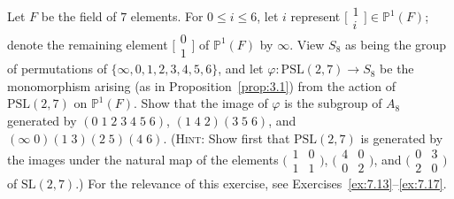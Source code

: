 \documentclass[../Odyssey_Project.tex]{subfiles}
\begin{document}
\begin{exercise}
\label{ex:6.9}
Let $F$ be the field of $7$ elements. For $0 \leq i \leq 6$, let $i$ represent $\bigl[\begin{smallmatrix}1\\ i\end{smallmatrix}\bigr] \in \mathbb{P}^1(F)$; denote the remaining element $\bigl[\begin{smallmatrix}0\\ 1\end{smallmatrix}\bigr]$ of $\mathbb{P}^1(F)$ by $\infty$. View $S_8$ as being the group of permutations of $\{\infty, 0, 1, 2, 3, 4, 5, 6\}$, and let $\varphi\colon \mathrm{PSL}(2,7) \to S_8$ be the monomorphism arising (as in Proposition~\ref{prop:3.1}) from the action of $\mathrm{PSL}(2,7)$ on $\mathbb{P}^1(F)$. Show that the image of $\varphi$ is the subgroup of $A_8$ generated by $(0\;1\;2\;3\;4\;5\;6)$, $(1\;4\;2)(3\;5\;6)$, and $(\infty\;0)(1\;3)(2\;5)(4\;6)$. (\textsc{Hint:} Show first that $\mathrm{PSL}(2,7)$ is generated by the images under the natural map of the elements $\bigl(\begin{smallmatrix}1 & 0\\ 1 & 1\end{smallmatrix}\bigr)$, $\bigl(\begin{smallmatrix}4 & 0\\ 0 & 2\end{smallmatrix}\bigr)$, and $\bigl(\begin{smallmatrix}0 & 3\\ 2 & 0\end{smallmatrix}\bigr)$ of $\mathrm{SL}(2,7)$.) For the relevance of this exercise, see Exercises~\ref{ex:7.13}--\ref{ex:7.17}.
\end{exercise}
\end{document}
